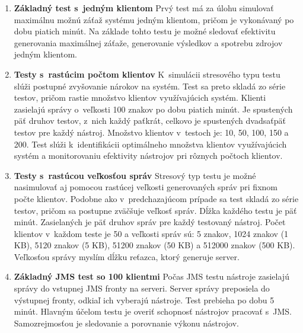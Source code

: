 \documentclass[12pt,oneside,final]{fithesis-utf8}
\begin{document}
\begin{enumerate}

\item \textbf{Základný test s~jedným klientom}
\newline
Prvý test má za úlohu simulovať maximálnu možnú záťaž systému jedným klientom, pričom je vykonávaný po dobu piatich minút. Na základe tohto testu je možné sledovať efektivitu generovania maximálnej záťaže, generovanie výsledkov a spotrebu zdrojov jedným klientom.
\newline

\item \textbf{Testy s~rastúcim počtom klientov}
\newline
K~simulácii stresového typu testu slúži postupné zvyšovanie nárokov na systém. Test sa preto skladá zo série testov, pričom rastie množstvo klientov využívajúcich systém. Klienti zasielajú správy o~veľkosti 100 znakov po dobu piatich minút. Je spustených päť druhov testov, z~nich každý paťkrát, celkovo je spustených dvadsaťpäť testov pre každý nástroj. Množstvo klientov v~testoch je: 10, 50, 100, 150 a 200. Test slúži k~identifikácii optimálneho množstva klientov využívajúcich systém a monitorovaniu efektivity nástrojov pri rôznych počtoch klientov.
\newline

\item \textbf{Testy s~rastúcou veľkosťou správ}
\newline
Stresový typ testu je možné nasimulovať aj pomocou rastúcej veľkosti generovaných správ pri fixnom počte klientov. Podobne ako v~predchazajúcom prípade sa test skladá zo série testov, pričom sa postupne zväčšuje veľkosť správ. Dĺžka každého testu je päť minút. Zasielaných je päť druhov správ pre každý testovaný nástroj. Počet klientov v~každom teste je 50 a veľkosti  správ sú: 5 znakov, 1024 znakov (1 KB), 5120 znakov (5 KB), 51200 znakov (50 KB) a 512000 znakov (500 KB). Veľkosťou správy myslím dĺžku reťazca, ktorý generuje server.
\newline

\newpage
\item \textbf{Základný JMS test so 100 klientmi}
\newline
Počas JMS testu nástroje zasielajú správy do vstupnej JMS fronty na serveri. Server správy preposiela do výstupnej fronty, odkiaľ ich vyberajú nástroje. Test prebieha po dobu 5 minút. Hlavným účelom testu je overiť schopnosť nástrojov pracovať s~JMS. Samozrejmosťou je sledovanie a porovnanie výkonu nástrojov.
\newline


\end{enumerate}
\end{document}
